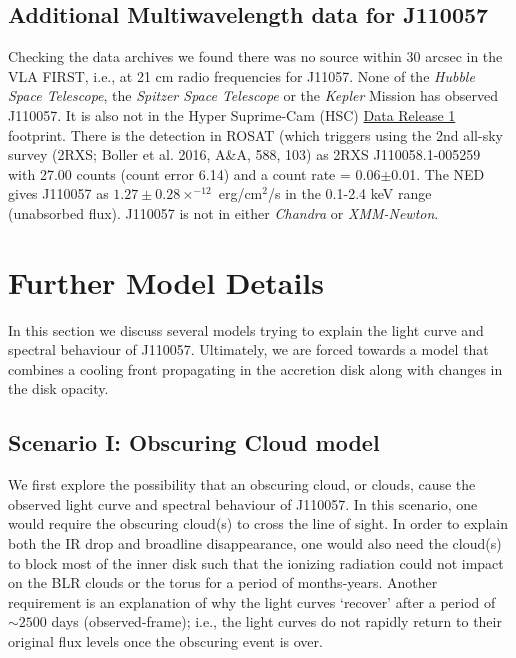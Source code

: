 \documentclass[11pt,a4paper]{article}
\begin{document}
\subsection*{Additional Multiwavelength data for J110057}
Checking the data archives we found there was no source within 30
arcsec in the VLA FIRST, i.e., at 21 cm radio frequencies for J11057.
None of the {\it Hubble Space Telescope}, the {\it Spitzer Space
Telescope} or the {\it Kepler} Mission has observed J110057.  It is
also not in the Hyper Suprime-Cam (HSC)
\href{https://hsc-release.mtk.nao.ac.jp/doc/}{Data Release 1}
\citep{Aihara2017} footprint. There is the detection in ROSAT (which
triggers using the 2nd all-sky survey (2RXS; Boller et al. 2016, A\&A,
588, 103) as 2RXS J110058.1-005259 with 27.00 counts (count error
6.14) and a count rate = 0.06$\pm$0.01. The NED gives J110057 as
$1.27\pm0.28 \times^{-12}$ erg/cm$^{2}$/s in the 0.1-2.4 keV range
(unabsorbed flux). J110057 is not in either {\it Chandra} or {\it
XMM-Newton}.


\section*{Further Model Details}
In this section we discuss several models trying to explain the light
curve and spectral behaviour of J110057. Ultimately, we are forced
towards a model that combines a cooling front propagating in the
accretion disk along with changes in the disk opacity.

\subsection*{Scenario I: Obscuring Cloud model}
We first explore the possibility that an obscuring cloud, or clouds,
cause the observed light curve and spectral behaviour of J110057.  In
this scenario, one would require the obscuring cloud(s) to cross the
line of sight. In order to explain both the IR drop and broadline
disappearance, one would also need the cloud(s) to block most of the
inner disk such that the ionizing radiation could not impact on the
BLR
clouds or the torus for a period of months-years.  Another requirement
is an explanation of why the light curves `recover' after a period of
$\sim 2500$ days (observed-frame); i.e., the light curves do not
rapidly return to their original flux levels once the obscuring event
is over.
\end{document}
